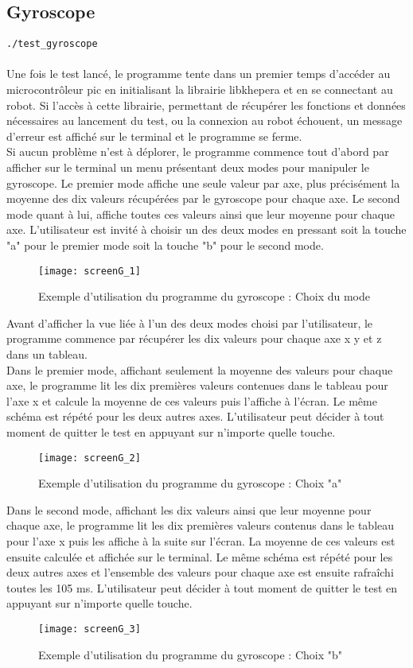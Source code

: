 \documentclass[11pt]{article} %
\begin{document}
\subsection{Gyroscope}
\verb|./test_gyroscope|\\
 \\
Une fois le test lancé, le programme tente dans un premier temps d’accéder au microcontrôleur pic en initialisant la librairie libkhepera et en se connectant au robot. Si l’accès à cette librairie, permettant de récupérer les fonctions et données nécessaires au lancement du test, ou la connexion au robot échouent, un message d’erreur est affiché sur le terminal et le programme se ferme.\\
Si aucun problème n’est à déplorer, le programme commence tout d’abord par afficher sur le terminal un menu présentant deux modes pour manipuler le gyroscope. Le premier mode affiche une seule valeur par axe, plus précisément la moyenne des dix valeurs récupérées par le gyroscope pour chaque axe. Le second mode quant à lui, affiche toutes ces valeurs ainsi que leur moyenne pour chaque axe. L’utilisateur est invité à choisir un des deux modes en pressant soit la touche "a" pour le premier mode soit la touche "b" pour le second mode.
\begin{figure}[H]
	\caption{Exemple d'utilisation du programme du gyroscope : Choix du mode}
	\texttt{[image: screenG\_1]}
\end{figure}
Avant d’afficher la vue liée à l’un des deux modes choisi par l’utilisateur, le programme commence par récupérer les dix valeurs pour chaque axe x y et z dans un tableau.\\
Dans le premier mode, affichant seulement la moyenne des valeurs pour chaque axe, le programme lit les dix premières valeurs contenues dans le tableau pour l’axe x et calcule la moyenne de ces valeurs puis l’affiche à l’écran. Le même schéma est répété pour les deux autres axes. L’utilisateur peut décider à tout moment de quitter le test en appuyant sur n’importe quelle touche.\\
\begin{figure}[H]
	\caption{Exemple d'utilisation du programme du gyroscope : Choix "a"}
	\texttt{[image: screenG\_2]}
\end{figure}
Dans le second mode, affichant les dix valeurs ainsi que leur moyenne pour chaque axe, le programme lit les dix premières valeurs contenus dans le tableau pour l’axe x puis les affiche à la suite sur l’écran. La moyenne de ces valeurs est ensuite calculée et affichée sur le terminal. Le même schéma est répété pour les deux autres axes et l’ensemble des valeurs pour chaque axe est ensuite rafraîchi toutes les 105 ms. L’utilisateur peut décider à tout moment de quitter le test en appuyant sur n’importe quelle touche.\\
\begin{figure}[H]
	\centering
	\caption{Exemple d'utilisation du programme du gyroscope : Choix "b"}
	\texttt{[image: screenG\_3]}
\end{figure}
\end{document}

